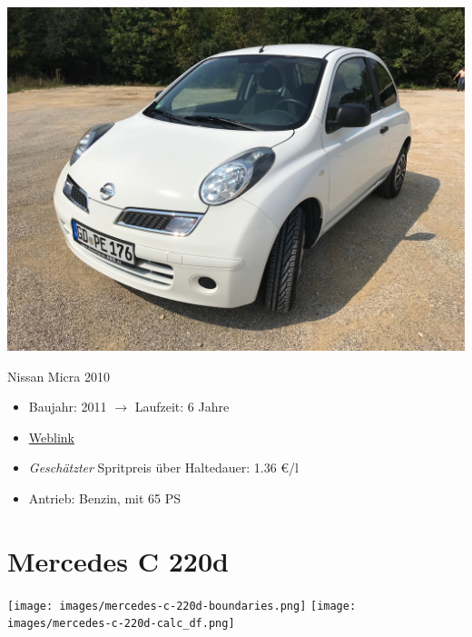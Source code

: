 \documentclass[landscape, DIV=99, 14pt]{scrartcl}
\begin{document}
\pagebreak
\null
\vspace{2cm}
\begin{center}
\includegraphics[width=0.9\columnwidth]{cars/nissan-micra.jpg}

Nissan Micra 2010
\end{center}

\begin{itemize}
    \item Baujahr: 2011 $\rightarrow$ Laufzeit: 6 Jahre
    \item \href{https://de.wikipedia.org/wiki/Nissan_Micra\#Micra_(K12,_2003%E2%80%932010)}{Weblink}
    \item \emph{Gesch\"atzter} Spritpreis \"uber Haltedauer: 1.36 \euro{}/l
    \item Antrieb: Benzin, mit 65 PS
\end{itemize}

\pagebreak


\twocolumn

\section*{Mercedes C 220d}
\begin{center}
\texttt{[image: images/mercedes-c-220d-boundaries.png]}
\null
\vspace{0.5cm}
\texttt{[image: images/mercedes-c-220d-calc\_df.png]}
\end{center}
\end{document}

